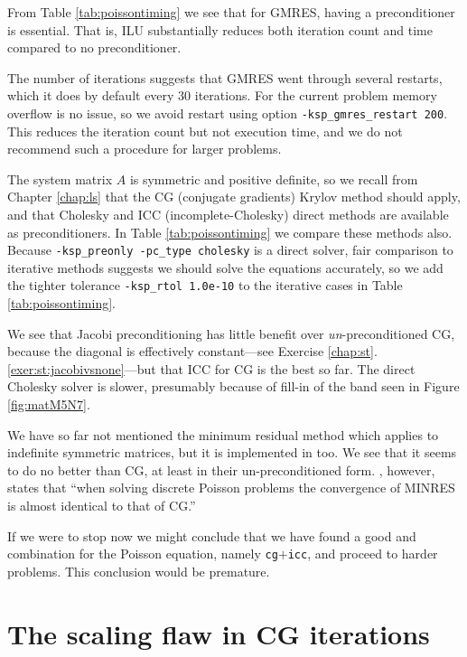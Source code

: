 From Table \ref{tab:poissontiming} we see that for GMRES, having a preconditioner is essential.  That is, ILU substantially reduces both iteration count and time compared to no preconditioner.

The number of iterations suggests that GMRES went through several restarts, which it does by default every 30 iterations.  For the current problem memory overflow is no issue, so we avoid restart using option \texttt{-ksp\_gmres\_restart 200}.  This reduces the iteration count but not execution time, and we do not recommend such a procedure for larger problems.

The system matrix $A$ is symmetric and positive definite, so we recall from Chapter \ref{chap:ls} that the CG (conjugate gradients) Krylov method should apply, and that Cholesky and ICC (incomplete-Cholesky) direct methods are available as preconditioners.  In Table \ref{tab:poissontiming} we compare these methods also.  Because \texttt{-ksp\_preonly -pc\_type cholesky} is a direct solver, fair comparison to iterative methods suggests we should solve the equations accurately, so we add the tighter tolerance \texttt{-ksp\_rtol 1.0e-10} to the iterative cases in Table \ref{tab:poissontiming}.

We see that Jacobi preconditioning has little benefit over \emph{un}-preconditioned CG, because the diagonal is effectively constant---see Exercise \ref{chap:st}.\ref{exer:st:jacobivsnone}---but that ICC for CG is the best so far.  The direct Cholesky solver is slower, presumably because of fill-in of the band seen in Figure \ref{fig:matM5N7}.

We have so far not mentioned the minimum residual method \citep[MINRES]{Greenbaum1997} which applies to indefinite symmetric matrices, but it is implemented in \PETSc too.  We see that it seems to do no better than CG, at least in their un-preconditioned form.  \citet[][p.~88]{Elmanetal2005}, however, states that ``when solving discrete Poisson problems the convergence of MINRES is almost identical to that of CG.''

If we were to stop now we might conclude that we have found a good \pKSP and \pPC combination for the Poisson equation, namely \texttt{cg}$+$\texttt{icc}, and proceed to harder problems.  This conclusion would be premature.


\section{The scaling flaw in CG iterations}

